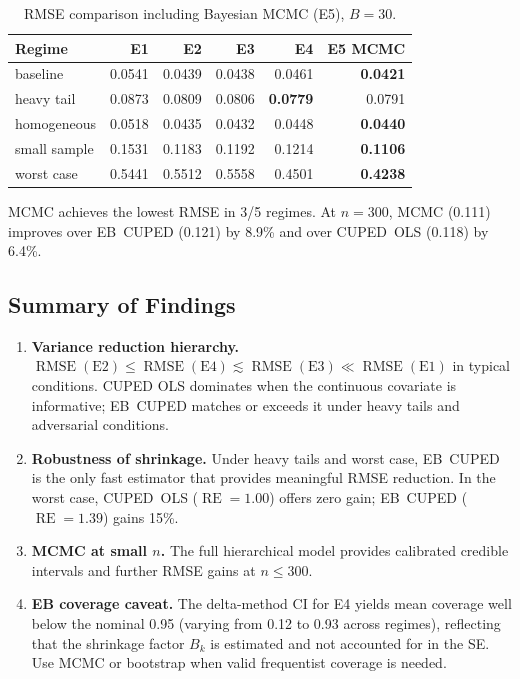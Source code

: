 \documentclass[11pt,letterpaper]{article}
\newcommand{\RMSE}{\operatorname{RMSE}}
\newcommand{\RE}{\operatorname{RE}}
\begin{document}
\begin{table}[htbp]
\centering
\caption{RMSE comparison including Bayesian MCMC (E5), $B=30$.}
\label{tab:mcmc-mc}
\small
\begin{tabular}{@{}l rrrrr@{}}
\toprule
Regime & E1 & E2 & E3 & E4 & E5 MCMC \\
\midrule
baseline     & 0.0541 & 0.0439 & 0.0438 & 0.0461 & \textbf{0.0421} \\
heavy tail   & 0.0873 & 0.0809 & 0.0806 & \textbf{0.0779} & 0.0791 \\
homogeneous  & 0.0518 & 0.0435 & 0.0432 & 0.0448 & \textbf{0.0440} \\
small sample & 0.1531 & 0.1183 & 0.1192 & 0.1214 & \textbf{0.1106} \\
worst case   & 0.5441 & 0.5512 & 0.5558 & 0.4501 & \textbf{0.4238} \\
\bottomrule
\end{tabular}
\end{table}

MCMC achieves the lowest RMSE in 3/5 regimes.  At $n=300$, MCMC
(0.111) improves over EB~CUPED (0.121) by 8.9\% and over CUPED~OLS
(0.118) by 6.4\%.


\subsection{Summary of Findings}

\begin{enumerate}[label=(\roman*)]
  \item \textbf{Variance reduction hierarchy.}
    $\RMSE(\text{E2}) \le \RMSE(\text{E4}) \lesssim \RMSE(\text{E3})
    \ll \RMSE(\text{E1})$ in typical conditions.  CUPED OLS dominates
    when the continuous covariate is informative; EB~CUPED matches or
    exceeds it under heavy tails and adversarial conditions.

  \item \textbf{Robustness of shrinkage.}  Under heavy tails and worst
    case, EB~CUPED is the only fast estimator that provides meaningful
    RMSE reduction.  In the worst case, CUPED~OLS ($\RE = 1.00$) offers
    zero gain; EB~CUPED ($\RE = 1.39$) gains 15\%.

  \item \textbf{MCMC at small $n$.}  The full hierarchical model provides
    calibrated credible intervals and further RMSE gains at $n \le 300$.

  \item \textbf{EB coverage caveat.}  The delta-method CI for E4 yields
    mean coverage well below the nominal 0.95 (varying from 0.12 to
    0.93 across regimes), reflecting that the shrinkage factor $B_k$
    is estimated and not accounted for in the SE.  Use MCMC or
    bootstrap when valid frequentist coverage is needed.
\end{enumerate}
\end{document}
